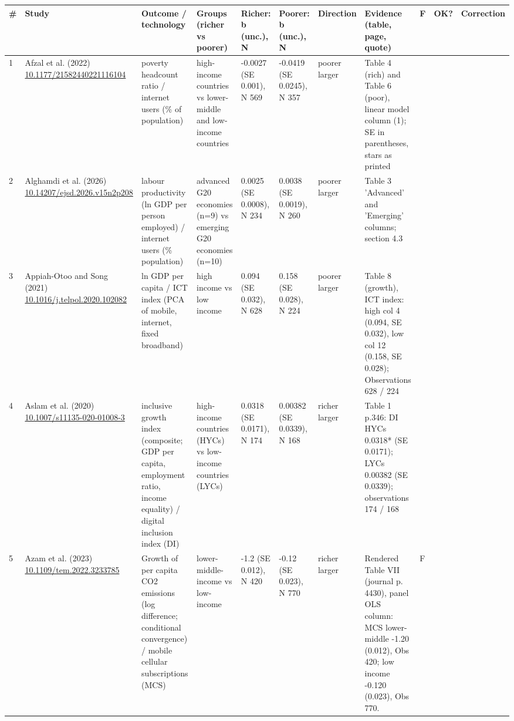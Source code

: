 \documentclass[10pt,a4paper]{article}
\begin{document}
\begin{longtable}{@{}p{0.4cm}p{2.4cm}p{2.6cm}p{3.0cm}p{2.6cm}p{2.6cm}p{1.5cm}p{5.6cm}p{0.3cm}p{1.0cm}p{1.6cm}@{}}
\toprule \# & Study & Outcome / technology & Groups (richer vs poorer) & Richer: b (unc.), N & Poorer: b (unc.), N & Direction & Evidence (table, page, quote) & F & OK? & Correction\\ \midrule \endhead
1 & Afzal et al. (2022) \newline \url{10.1177/21582440221116104} & poverty headcount ratio / internet users (\% of population) & high-income countries vs lower-middle and low-income countries & -0.0027 (SE 0.001), N 569 & -0.0419 (SE 0.0245), N 357 & poorer larger & Table 4 (rich) and Table 6 (poor), linear model column (1); SE in parentheses, stars as printed &  &  &  \\ \midrule
2 & Alghamdi et al. (2026) \newline \url{10.14207/ejsd.2026.v15n2p208} & labour productivity (ln GDP per person employed) / internet users (\% population) & advanced G20 economies (n=9) vs emerging G20 economies (n=10) & 0.0025 (SE 0.0008), N 234 & 0.0038 (SE 0.0019), N 260 & poorer larger & Table 3 'Advanced' and 'Emerging' columns; section 4.3 &  &  &  \\ \midrule
3 & Appiah-Otoo and Song (2021) \newline \url{10.1016/j.telpol.2020.102082} & ln GDP per capita / ICT index (PCA of mobile, internet, fixed broadband) & high income vs low income & 0.094 (SE 0.032), N 628 & 0.158 (SE 0.028), N 224 & poorer larger & Table 8 (growth), ICT index: high col 4 (0.094, SE 0.032), low col 12 (0.158, SE 0.028); Observations 628 / 224 &  &  &  \\ \midrule
4 & Aslam et al. (2020) \newline \url{10.1007/s11135-020-01008-3} & inclusive growth index (composite; GDP per capita, employment ratio, income equality) / digital inclusion index (DI) & high-income countries (HYCs) vs low-income countries (LYCs) & 0.0318 (SE 0.0171), N 174 & 0.00382 (SE 0.0339), N 168 & richer larger & Table 1 p.346: DI HYCs 0.0318* (SE 0.0171); LYCs 0.00382 (SE 0.0339); observations 174 / 168 &  &  &  \\ \midrule
5 & Azam et al. (2023) \newline \url{10.1109/tem.2022.3233785} & Growth of per capita CO2 emissions (log difference; conditional convergence) / mobile cellular subscriptions (MCS) & lower-middle-income vs low-income & -1.2 (SE 0.012), N 420 & -0.12 (SE 0.023), N 770 & richer larger & Rendered Table VII (journal p. 4430), panel OLS column: MCS lower-middle -1.20 (0.012), Obs 420; low income -0.120 (0.023), Obs 770. & F &  &  \\ \midrule

\end{longtable}
\end{document}
